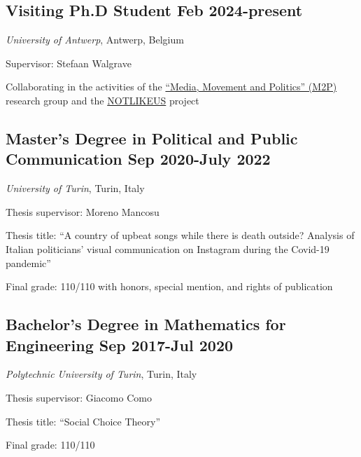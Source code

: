 \documentclass[10pt,]{article}
\providecommand{\tightlist}{%
  \setlength{\itemsep}{0pt}\setlength{\parskip}{0pt}}
\renewenvironment{itemize}{
  \begin{list}{}{
    \setlength{\leftmargin}{1.5em}
  }
}{
  \end{list}
}
\begin{document}
\subsection{\texorpdfstring{Visiting Ph.D Student \hfill Feb
2024-present}{Visiting Ph.D Student Feb 2024-present}}\label{visiting-ph.d-student-feb-2024-present}

\begin{itemize}
\tightlist
\item
  \emph{University of Antwerp}, Antwerp, Belgium
\item
  Supervisor: Stefaan Walgrave
\item
  Collaborating in the activities of the
  \href{https://www.uantwerpen.be/en/research-groups/m2p/}{``Media,
  Movement and Politics'' (M2P)} research group and the
  \href{https://notlikeus.be/}{NOTLIKEUS} project
\end{itemize}

\subsection{\texorpdfstring{Master's Degree in Political and Public
Communication \hfill Sep 2020-July
2022}{Master's Degree in Political and Public Communication Sep 2020-July 2022}}\label{masters-degree-in-political-and-public-communication-sep-2020-july-2022}

\begin{itemize}
\tightlist
\item
  \emph{University of Turin}, Turin, Italy
\item
  Thesis supervisor: Moreno Mancosu
\item
  Thesis title: ``A country of upbeat songs while there is death
  outside? Analysis of Italian politicians' visual communication on
  Instagram during the Covid-19 pandemic''
\item
  Final grade: 110/110 with honors, special mention, and rights of
  publication
\end{itemize}

\subsection{\texorpdfstring{Bachelor's Degree in Mathematics for
Engineering \hfill Sep 2017-Jul
2020}{Bachelor's Degree in Mathematics for Engineering Sep 2017-Jul 2020}}\label{bachelors-degree-in-mathematics-for-engineering-sep-2017-jul-2020}

\begin{itemize}
\tightlist
\item
  \emph{Polytechnic University of Turin}, Turin, Italy
\item
  Thesis supervisor: Giacomo Como
\item
  Thesis title: ``Social Choice Theory''
\item
  Final grade: 110/110
\end{itemize}
\end{document}
